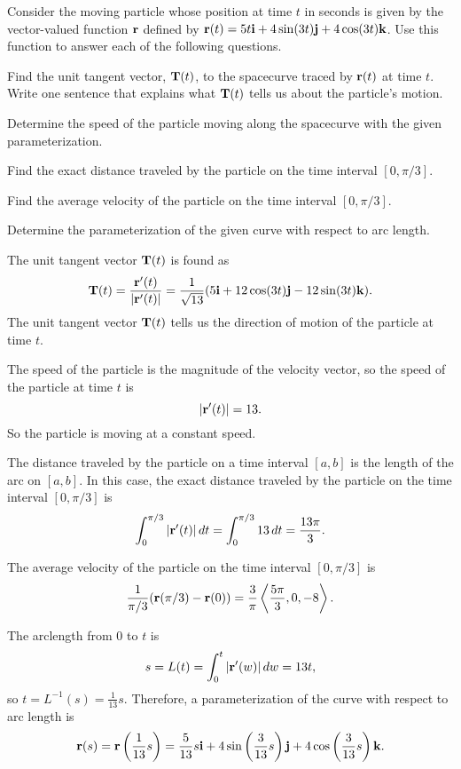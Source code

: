 \begin{exercises} 

\item \label{Ez:9.8.1}    Consider the moving particle whose position at time $t$ in seconds is given by the vector-valued function $\mathbf{r}$ defined by $\mathbf{r}(t) = 5t \mathbf{i} + 4\sin(3t) \mathbf{j} + 4\cos(3t) \mathbf{k}$.  Use this function to answer each of the following questions. 
				
    \ba
   	\item Find the unit tangent vector, $\mathbf{T}(t)$, to the spacecurve traced by $\mathbf{r}(t)$ at time $t$.  Write one sentence that explains what $\mathbf{T}(t)$ tells us about the particle's motion.
     	\item Determine the speed of the particle moving along the spacecurve with the given parameterization.
	\item Find the exact distance traveled by the particle on the time interval $[0,\pi/3]$.
	\item Find the average velocity of the particle on the time interval $[0, \pi/3]$.
	\item Determine the parameterization of the given curve with respect to arc length.
    \ea


\begin{exerciseSolution}
 \ba
   	\item The unit tangent vector $\mathbf{T}(t)$ is found as 
\[\mathbf{T}(t) = \frac{\mathbf{r}'(t)}{|\mathbf{r}'(t)|} = \frac{1}{\sqrt{13}}(5 \mathbf{i} + 12\cos(3t) \mathbf{j} - 12\sin(3t) \mathbf{k}).\]
The unit tangent vector $\mathbf{T}(t)$ tells us the direction of motion of the particle at time $t$. 
    \item The speed of the particle is the magnitude of the velocity vector, so the speed of the particle at time $t$ is 
    \[|\mathbf{r}'(t)| = 13.\]
So the particle is moving at a constant speed. 
	\item The distance traveled by the particle on a time interval $[a,b]$ is the length of the arc on $[a,b]$. In this case, the exact distance traveled by the particle on the time interval $[0,\pi/3]$ is
	\[\int_0^{\pi/3} |\mathbf{r}'(t)| \, dt = \int_0^{\pi/3} 13 \, dt = \frac{13 \pi}{3}.\]
	\item The average velocity of the particle on the time interval $[0, \pi/3]$ is
	\[\frac{1}{\pi/3} (\mathbf{r}(\pi/3) - \mathbf{r}(0)) = \frac{3}{\pi} \left\langle \frac{5 \pi}{3}, 0, -8 \right\rangle.\] 
	\item The arclength from $0$ to $t$ is 
\[s = L(t) = \int_0^t |\mathbf{r}'(w)| \, dw = 13 t,\]
so $t = L^{-1}(s) = \frac{1}{13}s$. Therefore, a parameterization of the curve with respect to arc length is
\[\mathbf{r}(s) = \mathbf{r}\left(\frac{1}{13}s\right) =  \frac{5}{13}s \mathbf{i} + 4\sin\left(\frac{3}{13}s\right) \mathbf{j} + 4\cos\left(\frac{3}{13}s\right) \mathbf{k}.\]
    \ea
\end{exerciseSolution}



\end{exercises}
